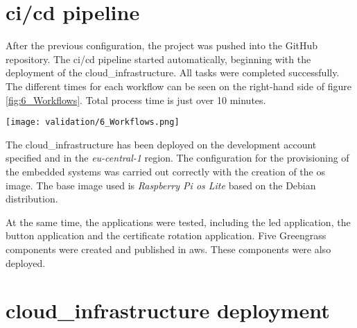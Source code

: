 \section{\texorpdfstring{\acrshort{ci}/\acrshort{cd}}{} pipeline}

After the previous configuration, the project was pushed into the GitHub repository. The \acrshort{ci}/\acrshort{cd} pipeline started automatically, beginning with the deployment of the \gls{cloud_infrastructure}. All tasks were completed successfully. The different times for each workflow can be seen on the right-hand side of figure \ref{fig:6_Workflows}. Total process time is just over 10 minutes.
\begin{center}
    \begingroup
    \texttt{[image: validation/6\_Workflows.png]}
    \label{fig:6_Workflows}
    \endgroup
\end{center}
The \gls{cloud_infrastructure} has been deployed on the development account specified and in the \textit{eu-central-1} region. The configuration for the provisioning of the embedded systems was carried out correctly with the creation of the \acrshort{os} image. The base image used is \textit{Raspberry Pi \acrshort{os} Lite} based on the Debian distribution.

At the same time, the applications were tested, including the led application, the button application and the certificate rotation application. Five Greengrass components were created and published in \gls{aws}. These components were also deployed.

\section{\texorpdfstring{\Gls{cloud_infrastructure}}{} deployment}

